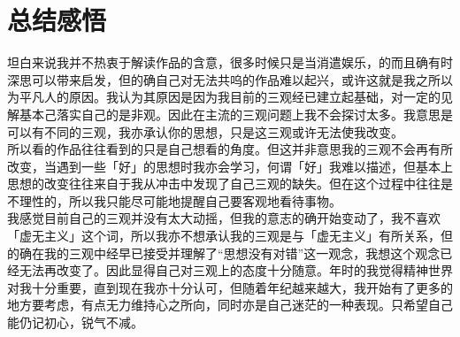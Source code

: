 \documentclass[supercite]{Experimental_Report}
\theoremstyle{definition}
\begin{document}
	\newpage
	

	\section{总结感悟}
	
	坦白来说我并不热衷于解读作品的含意，很多时候只是当消遣娱乐，的而且确有时深思可以带来启发，但的确自己对无法共呜的作品难以起兴，或许这就是我之所以为平凡人的原因。我认为其原因是因为我目前的三观经已建立起基础，对一定的见解基本己落实自己的是非观。因此在主流的三观问题上我不会探讨太多。我意思是可以有不同的三观，我亦承认你的思想，只是这三观或许无法使我改变。
	\\所以看的作品往往看到的只是自己想看的角度。但这并非意思我的三观不会再有所改变，当遇到一些「好」的思想时我亦会学习，何谓「好」我难以描述，但基本上思想的改变往往来自于我从冲击中发现了自己三观的缺失。但在这个过程中往往是不理性的，所以我只能尽可能地提醒自己要客观地看待事物。
	\\我感觉目前自己的三观并没有太大动摇，但我的意志的确开始变动了，我不喜欢「虚无主义」这个词，所以我亦不想承认我的三观是与「虚无主义」有所关系，但的确在我的三观中经早已接受并理解了“思想没有对错”这一观念，我想这个观念已经无法再改变了。因此显得自己对三观上的态度十分随意。年时的我觉得精神世界对我十分重要，直到现在我亦十分认可，但随着年纪越来越大，我开始有了更多的地方要考虑，有点无力维持心之所向，同时亦是自己迷茫的一种表现。只希望自己能仍记初心，锐气不减。
	
	
	
\end{document}
